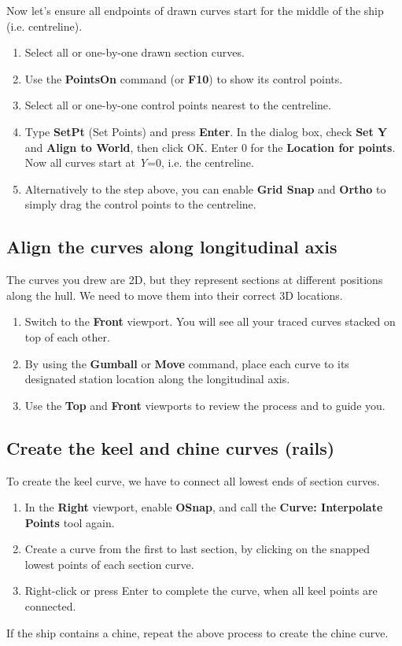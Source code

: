 \documentclass{article}
\begin{document}
Now let's ensure all endpoints of drawn curves start for the middle of the ship (i.e. centreline).

\begin{enumerate}
\item Select all or one-by-one drawn section curves.
\item Use the \textbf{PointsOn} command (or \textbf{F10}) to show its control points.
\item Select all or one-by-one control points nearest to the centreline.
\item Type \textbf{SetPt} (Set Points) and press \textbf{Enter}. In the dialog box, check \textbf{Set Y} and \textbf{Align to World}, then click OK. Enter 0 for the \textbf{Location for points}. Now all curves start at \textit{Y}=0, i.e. the centreline.
\item Alternatively to the step above, you can enable \textbf{Grid Snap} and \textbf{Ortho} to simply drag the control points to the centreline.
\end{enumerate}

\subsection{Align the curves along longitudinal axis}

The curves you drew are 2D, but they represent sections at different positions along the hull. We need to move them into their correct 3D locations.

\begin{enumerate}
\item Switch to the \textbf{Front} viewport. You will see all your traced curves stacked on top of each other.
\item By using the \textbf{Gumball} or \textbf{Move} command, place each curve to its designated station location along the longitudinal axis.
\item Use the \textbf{Top} and \textbf{Front} viewports to review the process and to guide you.
\end{enumerate}

\subsection{Create the keel and chine curves (rails)}

To create the keel curve, we have to connect all lowest ends of section curves.

\begin{enumerate}
\item In the \textbf{Right} viewport, enable \textbf{OSnap}, and call the \textbf{Curve: Interpolate Points} tool again.
\item Create a curve from the first to last section, by clicking on the snapped lowest points of each section curve.
\item Right-click or press Enter to complete the curve, when all keel points are connected.
\end{enumerate}

If the ship contains a chine, repeat the above process to create the chine curve.
\end{document}
